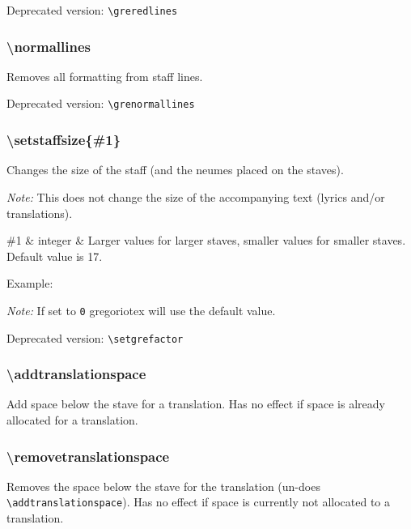 \smallskip\hskip 15pt Deprecated version: \verb=\greredlines=

\subsubsection*{\textbackslash normallines}
Removes all formatting from staff lines.

\smallskip\hskip 15pt Deprecated version: \verb=\grenormallines=

\subsubsection*{\textbackslash setstaffsize\{\#1\}}
Changes the size of the staff (and the neumes placed on the staves).

\emph{Note:} This does not change the size of the accompanying text
(lyrics and/or translations).

\begin{argtable}
  \#1 & integer & Larger values for larger staves, smaller values for
  smaller staves. Default value is 17. \\
\end{argtable}

Example:\par\medskip
\begin{latexcode}
\end{latexcode}

\emph{Note:} If set to \verb=0= gregoriotex will use the default value.

\smallskip\hskip 15pt Deprecated version: \verb=\setgrefactor=

\subsubsection*{\textbackslash addtranslationspace}
Add space below the stave for a translation.  Has no effect if space
is already allocated for a translation.

\subsubsection*{\textbackslash removetranslationspace}
Removes the space below the stave for the translation (un-does\\
\verb=\addtranslationspace=). Has no effect if space is currently not
allocated to a translation.


